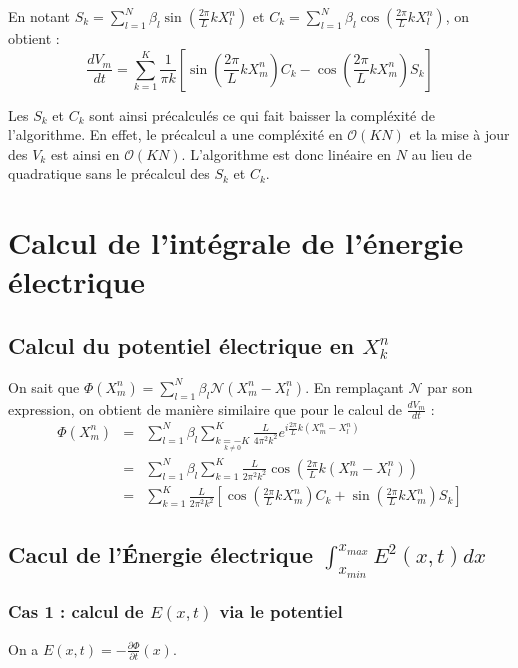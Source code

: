 \documentclass[a4paper,11pt]{article}
\begin{document}
En notant $S_k = \sum\limits_{l=1}^N \beta_l \sin(\frac{2 \pi}{L}kX_l^n)$ et $C_k = \sum\limits_{l=1}^N \beta_l \cos(\frac{2 \pi}{L}kX_l^n)$, on obtient :
$$
\frac{d V_m} {dt} = \sum\limits_{k=1}^K \frac{1}{ \pi k} [\sin (\frac{2 \pi}{L} kX_m^n)C_k - \cos(\frac{2 \pi}{L} kX_m^n)S_k]
$$

Les $S_k$ et $C_k$ sont ainsi précalculés ce qui fait baisser la compléxité de l'algorithme. En effet, le précalcul a une compléxité en $\mathcal{O}(KN)$ et la mise à jour des $V_k$ est ainsi en $\mathcal{O}(KN)$. L'algorithme est donc linéaire en $N$ au lieu de quadratique sans le précalcul des $S_k$ et $C_k$.

\section{Calcul de l'intégrale de l'énergie électrique}

\subsection{Calcul du potentiel électrique en $X_k^n$}

On sait que $\Phi (X_m^n) = \sum\limits_{l=1}^N \beta_l \mathcal{N}(X_m^n - X_l^n)$. En remplaçant $\mathcal{N}$ par son expression, on obtient de manière similaire que pour le calcul de $\frac{dV_m}{dt}$ :
$$
\begin{array}{rcl}
\Phi (X_m^n) &=& \sum\limits_{l=1}^N \beta_l \sum\limits_{\underset{k \neq 0}{k=-K}}^K \frac{L}{4 \pi^2 k^2}  e^{i\frac{2 \pi}{L} k(X_m^n - X_l^n)} \\
 &=& \sum\limits_{l=1}^N \beta_l \sum\limits_{k=1}^K \frac{L}{2 \pi^2 k^2}  \cos (\frac{2 \pi}{L} k(X_m^n - X_l^n)) \\
 &=& \sum\limits_{k=1}^K \frac{L}{2 \pi^2 k^2} [\cos (\frac{2 \pi}{L} kX_m^n)C_k + \sin(\frac{2 \pi}{L} kX_m^n)S_k]
\end{array}
$$

\subsection{Cacul de l'Énergie électrique $\int_{x_{min}}^{x_{max}} E^2(x,t)dx$}

\subsubsection{Cas 1 : calcul de $E(x,t)$ via le potentiel}
\label{energy pot}

On a $E(x,t) = - \frac{\partial \Phi}{\partial t}(x)$.
\end{document}
